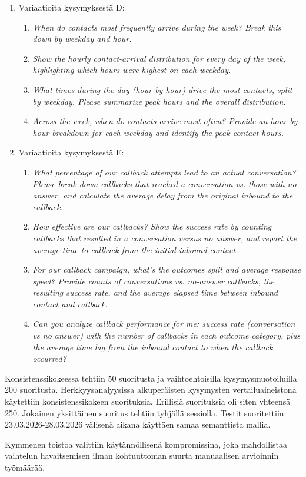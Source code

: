 \begin{enumerate}[label=\Alph*.]
\begin{enumerate}[label=\arabic*.]
      \item \textit{Among contacts answered within SLA, what proportion ended with customer closure versus agent closure?}
    \end{enumerate}
  \item Variaatioita kysymyksestä D:
    \begin{enumerate}[label=\arabic*.]
      \item \textit{When do contacts most frequently arrive during the week? Break this down by weekday and hour.}
      \item \textit{Show the hourly contact-arrival distribution for every day of the week, highlighting which hours were highest on each weekday.}
      \item \textit{What times during the day (hour-by-hour) drive the most contacts, split by weekday. Please summarize peak hours and the overall distribution.}
      \item \textit{Across the week, when do contacts arrive most often? Provide an hour-by-hour breakdown for each weekday and identify the peak contact hours.}
    \end{enumerate}
  \item Variaatioita kysymyksestä E:
    \begin{enumerate}[label=\arabic*.]
      \item \textit{What percentage of our callback attempts lead to an actual conversation? Please break down callbacks that reached a conversation vs. those with no answer, and calculate the average delay from the original inbound to the callback.}
      \item \textit{How effective are our callbacks? Show the success rate by counting callbacks that resulted in a conversation versus no answer, and report the average time-to-callback from the initial inbound contact.}
      \item \textit{For our callback campaign, what's the outcomes split and average response speed? Provide counts of conversations vs. no-answer callbacks, the resulting success rate, and the average elapsed time between inbound contact and callback.}
      \item \textit{Can you analyze callback performance for me: success rate (conversation vs no answer) with the number of callbacks in each outcome category, plus the average time lag from the inbound contact to when the callback occurred?}
    \end{enumerate}
\end{enumerate}

Konsistenssikokeessa tehtiin 50 suoritusta ja vaihtoehtoisilla kysymysmuotoiluilla 200 suoritusta. Herkkyysanalyysissa alkuperäisten kysymysten vertailuaineistona käytettiin konsistenssikokeen suorituksia. Erillisiä suorituksia oli siten yhteensä 250. Jokainen yksittäinen suoritus tehtiin tyhjällä sessiolla. Testit suoritettiin 23.03.2026-28.03.2026 välisenä aikana käyttäen samaa semanttista mallia.

Kymmenen toistoa valittiin käytännöllisenä kompromissina, joka mahdollistaa vaihtelun havaitsemisen ilman kohtuuttoman suurta manuaalisen arvioinnin työmäärää.
